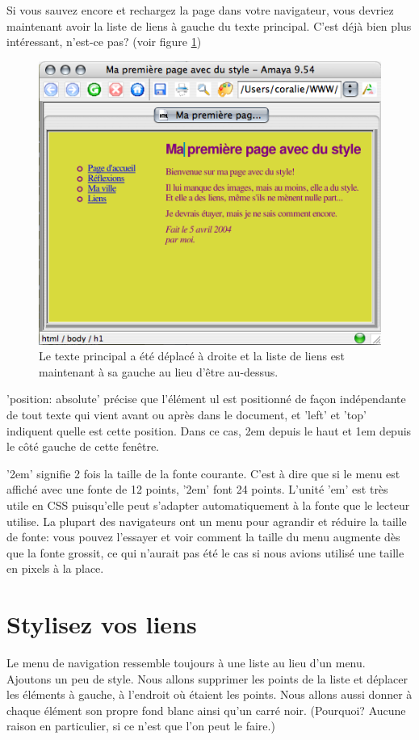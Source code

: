 Si vous sauvez encore et rechargez la page dans votre navigateur, vous devriez maintenant avoir la liste de liens à gauche du texte principal. C'est déjà bien plus intéressant, n'est-ce pas? (voir figure \ref{fig:screen5})
\begin{figure}[t]
	\begin{center}
		\includegraphics{voronin/img/capture4.png}	
		\caption{Le texte principal a été déplacé à droite et la liste de liens est maintenant à sa gauche au lieu d'être au-dessus. }
		\label{fig:screen5}
	\end{center}
\end{figure}
'position: absolute' précise que l'élément ul est positionné de façon indépendante de tout texte qui vient avant ou après dans le document, et 'left' et 'top' indiquent quelle est cette position. Dans ce cas, 2em depuis le haut et 1em depuis le côté gauche de cette fenêtre.

'2em' signifie 2 fois la taille de la fonte courante. C'est à dire que si le menu est affiché avec une fonte de 12 points, '2em' font 24 points. L'unité 'em' est très utile en CSS puisqu'elle peut s'adapter automatiquement à la fonte que le lecteur utilise. La plupart des navigateurs ont un menu pour agrandir et réduire la taille de fonte: vous pouvez l'essayer et voir comment la taille du menu augmente dès que la fonte grossit, ce qui n'aurait pas été le cas si nous avions utilisé une taille en pixels à la place. 
\normalsize
\section{Stylisez vos liens}
Le menu de navigation ressemble toujours à une liste au lieu d'un menu. Ajoutons un peu de style. Nous allons supprimer les points de la liste et déplacer les éléments à gauche, à l'endroit où étaient les points. Nous allons aussi donner à chaque élément son propre fond blanc ainsi qu'un carré noir. (Pourquoi? Aucune raison en particulier, si ce n'est que l'on peut le faire.)

